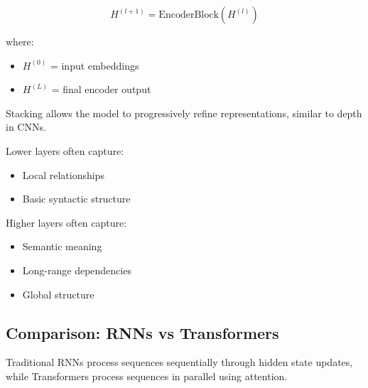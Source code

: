 \documentclass[11pt]{article}
\begin{document}
\[
H^{(l+1)} =
\text{EncoderBlock}(H^{(l)})
\]

where:

\begin{itemize}[nosep]

\item $H^{(0)}$ = input embeddings
\item $H^{(L)}$ = final encoder output

\end{itemize}

Stacking allows the model to progressively refine representations, similar to depth in CNNs.

Lower layers often capture:

\begin{itemize}

\item Local relationships
\item Basic syntactic structure

\end{itemize}

Higher layers often capture:

\begin{itemize}

\item Semantic meaning
\item Long-range dependencies
\item Global structure

\end{itemize}

\subsection{Comparison: RNNs vs Transformers}

Traditional RNNs process sequences sequentially through hidden state updates, while Transformers process sequences in parallel using attention.
\end{document}

